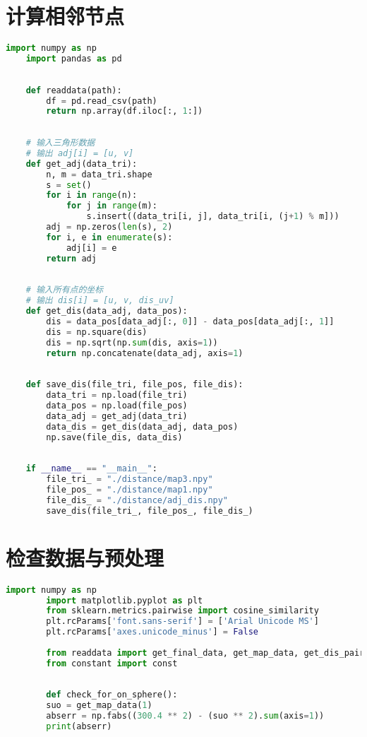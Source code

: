 \documentclass[withoutpreface,bwprint,fontset=macnew]{cumcmthesis} %
\begin{document}
\begin{appendices}
	\section{计算相邻节点}
	\begin{lstlisting}[language=python]
	import numpy as np
	import pandas as pd
	
	
	def readdata(path):
	    df = pd.read_csv(path)
	    return np.array(df.iloc[:, 1:])
	
	
	# 输入三角形数据
	# 输出 adj[i] = [u, v]
	def get_adj(data_tri):
	    n, m = data_tri.shape
	    s = set()
	    for i in range(n):
	        for j in range(m):
	            s.insert((data_tri[i, j], data_tri[i, (j+1) % m]))
	    adj = np.zeros(len(s), 2)
	    for i, e in enumerate(s):
	        adj[i] = e
	    return adj
	
	
	# 输入所有点的坐标
	# 输出 dis[i] = [u, v, dis_uv]
	def get_dis(data_adj, data_pos):
	    dis = data_pos[data_adj[:, 0]] - data_pos[data_adj[:, 1]]
	    dis = np.square(dis)
	    dis = np.sqrt(np.sum(dis, axis=1))
	    return np.concatenate(data_adj, axis=1)
	
	
	def save_dis(file_tri, file_pos, file_dis):
	    data_tri = np.load(file_tri)
	    data_pos = np.load(file_pos)
	    data_adj = get_adj(data_tri)
	    data_dis = get_dis(data_adj, data_pos)
	    np.save(file_dis, data_dis)
	
	
	if __name__ == "__main__":
	    file_tri_ = "./distance/map3.npy"
	    file_pos_ = "./distance/map1.npy"
	    file_dis_ = "./distance/adj_dis.npy"
	    save_dis(file_tri_, file_pos_, file_dis_)

	\end{lstlisting}

		\section{检查数据与预处理}
	
	\begin{lstlisting}[language=python]
		import numpy as np
		import matplotlib.pyplot as plt
		from sklearn.metrics.pairwise import cosine_similarity
		plt.rcParams['font.sans-serif'] = ['Arial Unicode MS']
		plt.rcParams['axes.unicode_minus'] = False
		
		from readdata import get_final_data, get_map_data, get_dis_pairs, get_adj_pairs, get_ori_data, get_movable_ids
		from constant import const
		
		
		def check_for_on_sphere():
		suo = get_map_data(1)
		abserr = np.fabs((300.4 ** 2) - (suo ** 2).sum(axis=1))
		print(abserr)
		

\end{lstlisting}
\end{appendices}
\end{document}

